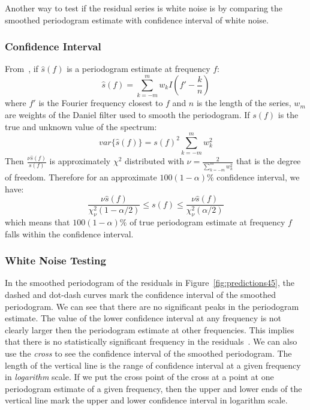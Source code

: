 \documentclass[12pt]{article}
\begin{document}
Another way to test if the residual series is white noise is by comparing the
smoothed periodogram estimate with confidence interval of white noise.

\subsubsection{Confidence Interval}
From~\cite{bloomfieldFourierTimeSeries}, if $\hat{s}(f)$ is a periodogram
estimate at frequency $f$: 
\begin{equation}
\hat{s}(f)=\sum_{k=-m}^mw_kI(f'-\frac{k}{n})
\end{equation}
where $f'$ is the Fourier frequency closest to $f$ and $n$ is the length
of the series, $w_m$ are weights of the Daniel filter used to smooth the
periodogram. If $s(f)$ is the true and unknown value of the spectrum:
\begin{equation}
var\{\hat{s}(f)\}=s(f)^2\sum_{k=-m}^mw_k^2
\end{equation}
Then
$\frac{\nu \hat{s}(f)}{s(f)}$ is approximately $\chi^2$ distributed with
$\nu=\frac{2}{\sum_{k=-m}^mw_k^2}$ that is the degree of freedom. Therefore for
an approximate $100(1-\alpha)\%$ confidence interval, we have:
\begin{equation}\label{eqn:confidenceInterval}
\frac{\nu\hat{s}(f)}{\chi_{\nu}^2(1-\alpha/2)}\leq s(f)\leq
\frac{\nu\hat{s}(f)}{\chi_{\nu}^2(\alpha/2)}
\end{equation}
which means that $100(1-\alpha)\%$ of true periodogram estimate at frequency $f$
falls within the confidence interval.
\subsubsection{White Noise Testing}
In the smoothed periodogram of the residuals in Figure~\ref{fig:predictions45},
the dashed and dot-dash curves mark the confidence interval of the smoothed
periodogram. We can see that there are no significant peaks in the periodogram
estimate. The value of the lower confidence interval at any frequency is not
clearly larger then the periodogram estimate at other frequencies. This implies that
there is no statistically significant frequency in the
residuals~\cite{CryerTimeSeries}. We can also use the \textit{cross} to see the
confidence interval of the smoothed periodogram. The length of the vertical line
is the range of confidence interval at a given frequency in \textit{logarithm} scale. If we put the cross point of
the cross at a point at one periodogram estimate of a given frequency, then the
upper and lower ends of the vertical line mark the upper and lower confidence
interval in logarithm scale.
\end{document}
